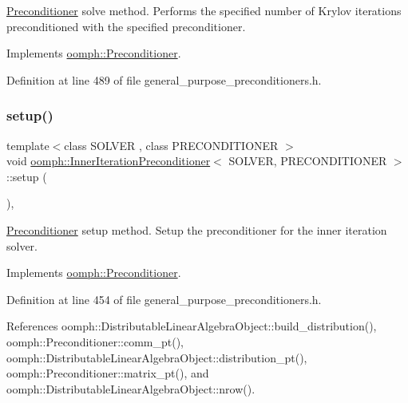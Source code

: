 \hyperlink{classoomph_1_1Preconditioner}{Preconditioner} solve method. Performs the specified number of Krylov iterations preconditioned with the specified preconditioner. 



Implements \hyperlink{classoomph_1_1Preconditioner_ace1199369e4465cd2b9a34884bb64ec8}{oomph\+::\+Preconditioner}.



Definition at line 489 of file general\+\_\+purpose\+\_\+preconditioners.\+h.

\mbox{\label{classoomph_1_1InnerIterationPreconditioner_a0c20b28ab82a5d7f277c9afef8e99287}} 
\subsubsection{\texorpdfstring{setup()}{setup()}}
{\footnotesize\ttfamily template$<$class S\+O\+L\+V\+ER , class P\+R\+E\+C\+O\+N\+D\+I\+T\+I\+O\+N\+ER $>$ \\
void \hyperlink{classoomph_1_1InnerIterationPreconditioner}{oomph\+::\+Inner\+Iteration\+Preconditioner}$<$ S\+O\+L\+V\+ER, P\+R\+E\+C\+O\+N\+D\+I\+T\+I\+O\+N\+ER $>$\+::setup (\begin{DoxyParamCaption}{ }\end{DoxyParamCaption})\hspace{0.3cm}{\ttfamily [inline]}, {\ttfamily [virtual]}}



\hyperlink{classoomph_1_1Preconditioner}{Preconditioner} setup method. Setup the preconditioner for the inner iteration solver. 



Implements \hyperlink{classoomph_1_1Preconditioner_af4886f4efe510e5c9b0eb19422943588}{oomph\+::\+Preconditioner}.



Definition at line 454 of file general\+\_\+purpose\+\_\+preconditioners.\+h.



References oomph\+::\+Distributable\+Linear\+Algebra\+Object\+::build\+\_\+distribution(), oomph\+::\+Preconditioner\+::comm\+\_\+pt(), oomph\+::\+Distributable\+Linear\+Algebra\+Object\+::distribution\+\_\+pt(), oomph\+::\+Preconditioner\+::matrix\+\_\+pt(), and oomph\+::\+Distributable\+Linear\+Algebra\+Object\+::nrow().

